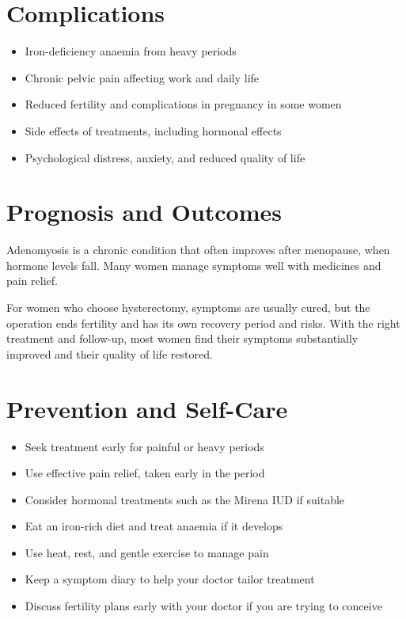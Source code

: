 \section*{Complications}
\begin{itemize}
    \item Iron-deficiency anaemia from heavy periods
    \item Chronic pelvic pain affecting work and daily life
    \item Reduced fertility and complications in pregnancy in some women
    \item Side effects of treatments, including hormonal effects
    \item Psychological distress, anxiety, and reduced quality of life
\end{itemize}

\section*{Prognosis and Outcomes}
Adenomyosis is a chronic condition that often improves after menopause, when hormone levels fall. Many women manage symptoms well with medicines and pain relief.

For women who choose hysterectomy, symptoms are usually cured, but the operation ends fertility and has its own recovery period and risks. With the right treatment and follow-up, most women find their symptoms substantially improved and their quality of life restored.

\section*{Prevention and Self-Care}
\begin{itemize}
    \item Seek treatment early for painful or heavy periods
    \item Use effective pain relief, taken early in the period
    \item Consider hormonal treatments such as the Mirena IUD if suitable
    \item Eat an iron-rich diet and treat anaemia if it develops
    \item Use heat, rest, and gentle exercise to manage pain
    \item Keep a symptom diary to help your doctor tailor treatment
    \item Discuss fertility plans early with your doctor if you are trying to conceive
\end{itemize}

